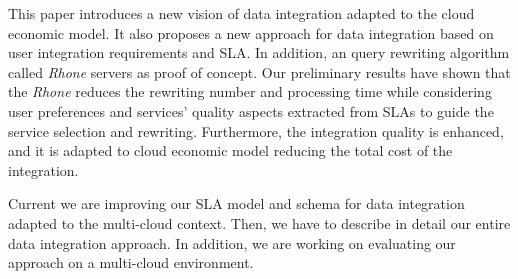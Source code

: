 This paper introduces a new vision of data integration adapted to the cloud economic model. It also proposes a new approach for data integration based on user integration requirements and SLA. In addition, an query rewriting algorithm called \textit{Rhone} servers as proof of concept. Our preliminary results have shown that the \textit{Rhone} reduces the rewriting number and processing time while considering user preferences and services' quality aspects extracted from SLAs to guide the service selection and rewriting. Furthermore, the integration quality is enhanced, and it is adapted to cloud economic model reducing the total cost of the integration.

Current we are improving our SLA model and schema for data integration adapted to the multi-cloud context. Then, we have to describe in detail our entire data integration approach. In addition, we are working on evaluating our approach on a multi-cloud environment.
